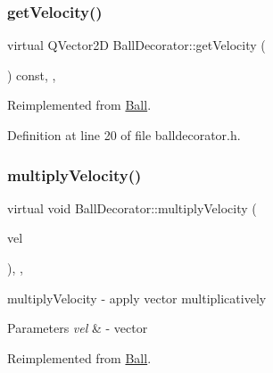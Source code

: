 \mbox{\label{class_ball_decorator_aa2123d7419801968b7fce98e546397b7}} 
\subsubsection{\texorpdfstring{get\+Velocity()}{getVelocity()}}
{\footnotesize\ttfamily virtual Q\+Vector2D Ball\+Decorator\+::get\+Velocity (\begin{DoxyParamCaption}{ }\end{DoxyParamCaption}) const\hspace{0.3cm}{\ttfamily [inline]}, {\ttfamily [override]}, {\ttfamily [virtual]}}



Reimplemented from \mbox{\hyperlink{class_ball_a016798bb733965c67e70b8abfc661e5b}{Ball}}.



Definition at line 20 of file balldecorator.\+h.

\mbox{\label{class_ball_decorator_ad1a9139a5c41d17d0eebf007afb984e7}} 
\subsubsection{\texorpdfstring{multiply\+Velocity()}{multiplyVelocity()}}
{\footnotesize\ttfamily virtual void Ball\+Decorator\+::multiply\+Velocity (\begin{DoxyParamCaption}\item[{const Q\+Vector2D \&}]{vel }\end{DoxyParamCaption})\hspace{0.3cm}{\ttfamily [inline]}, {\ttfamily [override]}, {\ttfamily [virtual]}}



multiply\+Velocity -\/ apply vector multiplicatively 


\begin{DoxyParams}{Parameters}
{\em vel} & -\/ vector \\
\hline
\end{DoxyParams}


Reimplemented from \mbox{\hyperlink{class_ball_aacc57301046fab52930f7615073136e0}{Ball}}.



